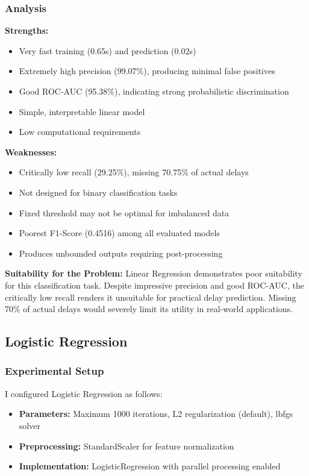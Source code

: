 \documentclass[sigconf]{acmart}
\begin{document}
\subsubsection{Analysis}
\textbf{Strengths:}
\begin{itemize}
    \item Very fast training (0.65s) and prediction (0.02s)
    \item Extremely high precision (99.07\%), producing minimal false positives
    \item Good ROC-AUC (95.38\%), indicating strong probabilistic discrimination
    \item Simple, interpretable linear model
    \item Low computational requirements
\end{itemize}

\textbf{Weaknesses:}
\begin{itemize}
    \item Critically low recall (29.25\%), missing 70.75\% of actual delays
    \item Not designed for binary classification tasks
    \item Fixed threshold may not be optimal for imbalanced data
    \item Poorest F1-Score (0.4516) among all evaluated models
    \item Produces unbounded outputs requiring post-processing
\end{itemize}

\textbf{Suitability for the Problem:} Linear Regression demonstrates poor suitability for this classification task. Despite impressive precision and good ROC-AUC, the critically low recall renders it unsuitable for practical delay prediction. Missing 70\% of actual delays would severely limit its utility in real-world applications.

\subsection{Logistic Regression}

\subsubsection{Experimental Setup}
I configured Logistic Regression as follows:
\begin{itemize}
    \item \textbf{Parameters:} Maximum 1000 iterations, L2 regularization (default), lbfgs solver
    \item \textbf{Preprocessing:} StandardScaler for feature normalization
    \item \textbf{Implementation:} LogisticRegression with parallel processing enabled
\end{itemize}
\end{document}
